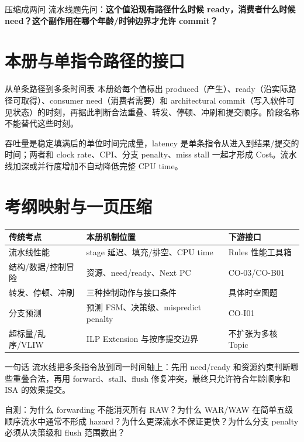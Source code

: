 \documentclass[UTF8,fontset=fandol,11pt,a4paper]{ctexart}
\newcommand{\kw}[1]{\textbf{\color{deep}#1}}
\begin{document}
\begin{methodbox}{压缩成两问}
流水线题先问：\kw{这个值沿现有路径什么时候 ready，消费者什么时候 need？这个副作用在哪个年龄/时钟边界才允许 commit？}
\end{methodbox}

\section{本册与单指令路径的接口}
\begin{corebox}{从单条路径到多条时间表}
本册给每个值标出 produced（产生）、ready（沿实际路径可取得）、consumer need（消费者需要）和 architectural commit（写入软件可见状态）的时刻，再据此判断合法重叠、转发、停顿、冲刷和提交顺序。阶段名称不能替代这些时刻。
\end{corebox}
吞吐量是稳定填满后的单位时间完成量，latency 是单条指令从进入到结果/提交的时间；两者和 clock rate、CPI、分支 penalty、miss stall 一起才形成 Cost。流水线加深或并行度增加不自动降低完整 CPU time。

\section{考纲映射与一页压缩}

\begin{center}
\small
\begin{tabularx}{\linewidth}{L{3.2cm}Y Y}
\toprule
传统考点 & 本册机制位置 & 下游接口\\
\midrule
流水线性能 & stage 延迟、填充/排空、CPU time & Rules 性能工具箱\\
结构/数据/控制冒险 & 资源、need/ready、Next PC & CO-03/CO-B01\\
转发、停顿、冲刷 & 三种控制动作与接口条件 & 具体时空图题\\
分支预测 & 预测 FSM、决策级、mispredict penalty & CO-I01\\
超标量/乱序/VLIW & ILP Extension 与按序提交边界 & 不扩张为多核 Topic\\
\bottomrule
\end{tabularx}
\end{center}

\begin{corebox}{一句话}
流水线把多条指令放到同一时间轴上：先用 need/ready 和资源约束判断哪些重叠合法，再用 forward、stall、flush 修复冲突，最终只允许符合年龄顺序和 ISA 的效果提交。
\end{corebox}

自测：为什么 forwarding 不能消灭所有 RAW？为什么 WAR/WAW 在简单五级顺序流水中通常不形成 hazard？为什么更深流水不保证更快？为什么分支 penalty 必须从决策级和 flush 范围数出？
\end{document}
